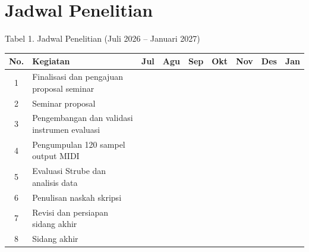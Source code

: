 \section{Jadwal Penelitian}

Tabel 1. Jadwal Penelitian (Juli 2026 -- Januari 2027)

\begin{table}[ht]
\centering
\begin{tabularx}{\textwidth}{|c|X|c|c|c|c|c|c|c|}
\hline
\textbf{No.} & \textbf{Kegiatan} & \textbf{Jul} & \textbf{Agu} & \textbf{Sep} & \textbf{Okt} & \textbf{Nov} & \textbf{Des} & \textbf{Jan} \\ \hline
1 & Finalisasi dan pengajuan proposal seminar & \cellcolor{gray!70} & & & & & & \\ \hline
2 & Seminar proposal & & \cellcolor{gray!70} & & & & & \\ \hline
3 & Pengembangan dan validasi instrumen evaluasi & & \cellcolor{gray!70} & \cellcolor{gray!70} & & & & \\ \hline
4 & Pengumpulan 120 sampel output MIDI & & & \cellcolor{gray!70} & \cellcolor{gray!70} & & & \\ \hline
5 & Evaluasi Strube dan analisis data & & & & \cellcolor{gray!70} & \cellcolor{gray!70} & & \\ \hline
6 & Penulisan naskah skripsi & & & & \cellcolor{gray!70} & \cellcolor{gray!70} & \cellcolor{gray!70} & \\ \hline
7 & Revisi dan persiapan sidang akhir & & & & & & \cellcolor{gray!70} & \cellcolor{gray!70} \\ \hline
8 & Sidang akhir & & & & & & & \cellcolor{gray!70} \\ \hline
\end{tabularx}
\end{table}